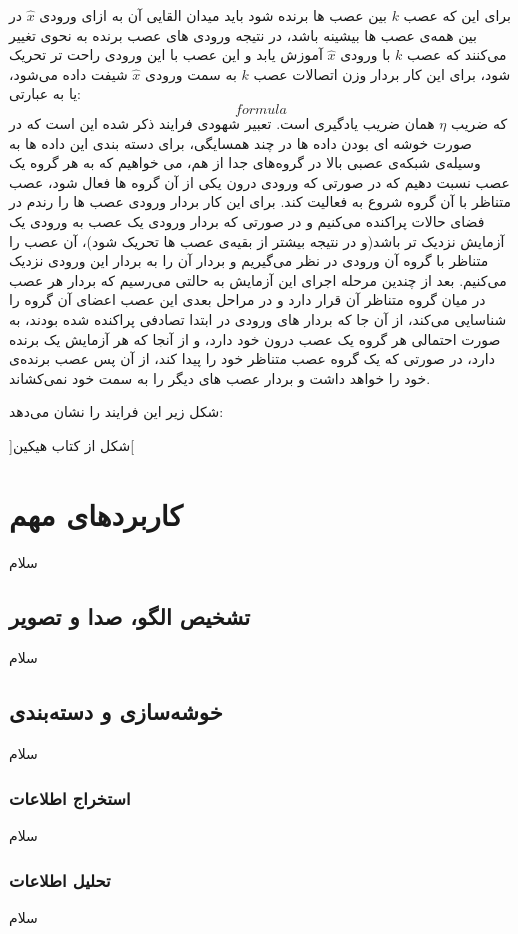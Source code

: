 \documentclass[11pt,a4paper,twocolumn]{article}
\begin{document}
برای این که عصب $k$ بین عصب ها برنده شود باید میدان القایی آن به ازای ورودی $\widehat x$ در بین همه‌ی عصب ها بیشینه باشد، در نتیجه ورودی های عصب برنده به نحوی تغییر می‌کنند که عصب  $k$ با ورودی $\widehat x$ آموزش یابد و این عصب با این ورودی راحت تر تحریک شود، برای این کار بردار وزن اتصالات عصب $k$ به سمت ورودی $\widehat x$ شیفت داده می‌شود، یا به عبارتی:
$$formula$$
که ضریب $\eta$ همان ضریب یادگیری است. تعبیر شهودی فرایند ذکر شده این است که در صورت خوشه ای بودن داده ها در چند همسایگی، برای دسته بندی این داده ها به وسیله‌ی شبکه‌ی عصبی بالا در گروه‌های جدا از هم، می خواهیم که به هر گروه یک عصب نسبت دهیم که در صورتی که ورودی درون یکی از آن گروه ها فعال شود، عصب متناظر با آن گروه شروع به فعالیت کند. برای این کار بردار ورودی عصب ها را رندم در فضای حالات پراکنده می‌کنیم و در صورتی که بردار ورودی یک عصب به ورودی یک آزمایش نزدیک تر باشد(و در نتیجه بیشتر از بقیه‌ی عصب ها تحریک شود)، آن عصب را متناظر با گروه آن ورودی در نظر می‌گیریم و بردار آن را به بردار این ورودی نزدیک می‌کنیم. بعد از چندین مرحله اجرای این آزمایش به حالتی می‌رسیم که بردار هر عصب در میان گروه متناظر آن قرار دارد و در مراحل بعدی این عصب اعضای آن گروه را شناسایی می‌کند، از آن جا که بردار های ورودی در ابتدا تصادفی پراکنده شده بودند، به صورت احتمالی هر گروه یک عصب درون خود دارد، و از آنجا که هر آزمایش یک برنده دارد، در صورتی که یک گروه عصب متناظر خود را پیدا کند، از آن پس عصب برنده‌ی خود را خواهد داشت و بردار عصب های دیگر را به سمت خود نمی‌کشاند.

شکل زیر این فرایند را نشان می‌دهد:

]شکل از کتاب هیکین[
\section{کاربرد‌های مهم}
سلام
\subsection{تشخیص الگو، صدا و تصویر}
سلام

\subsection{خوشه‌سازی و دسته‌بندی}
سلام
\subsubsection{استخراج اطلاعات}
سلام
\subsubsection{تحلیل اطلاعات}
سلام
\end{document}
